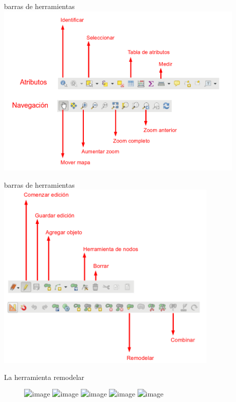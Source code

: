 \documentclass{beamer}
\begin{document}
\begin{frame}{barras de herramientas}
	\centering
	\includegraphics[width=0.9\textwidth]{IMGs/tb2}
\end{frame}

\begin{frame}{barras de herramientas}
	\centering
	\includegraphics[width=0.8\textwidth]{IMGs/tb3}
\end{frame}

\begin{frame}{La herramienta remodelar}
		    \begin{figure}
			    	\includegraphics<1>[width=0.8\textwidth]{IMGs/rem1}
			    	\includegraphics<2>[width=0.8\textwidth]{IMGs/rem2}
			    	\includegraphics<3>[width=0.8\textwidth]{IMGs/rem3}
			    	\includegraphics<4>[width=0.8\textwidth]{IMGs/rem4}
			    	\includegraphics<5>[width=0.8\textwidth]{IMGs/rem5}
			    \end{figure} 
\end{frame}
\end{document}
